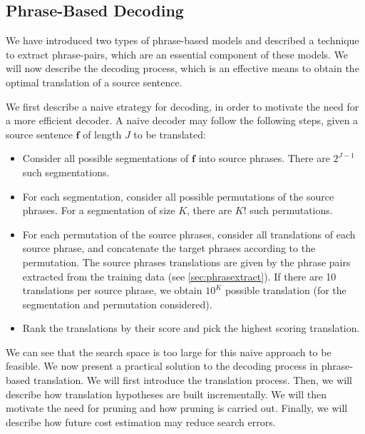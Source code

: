 \subsection{Phrase-Based Decoding}
\label{sec:phraseBasedDecoding}


We have introduced two types of phrase-based
models and described a technique to extract
phrase-pairs, which are an essential component
of these models. We will now describe the decoding
process, which is an effective means to obtain
the optimal translation of a source sentence.

We first describe a naive strategy for decoding, in order
to motivate the need for a more efficient decoder.
A naive decoder may follow the following steps, given
a source sentence $\bm{f}$ of length $J$ to be translated:
%
\begin{itemize}
  \item Consider all possible segmentations of $\bm{f}$ into source phrases. There are $2^{J - 1}$ such segmentations.
  \item For each segmentation, consider all possible permutations of the source phrases. For a segmentation of size $K$, there are $K!$ such permutations.
  \item For each permutation of the source phrases, consider all translations of each source phrase, and concatenate the target
    phrases according to the permutation. The source phrases translations are given by the phrase pairs extracted from the training
    data (see \autoref{sec:phrasextract}). If there are 10 translations per source phrase, we obtain
    $10^K$ possible translation (for the segmentation and permutation considered).
  \item Rank the translations by their score and pick the highest scoring translation.
\end{itemize}
%
We can see that the search space is too large for this naive
approach to be feasible.
We now present a practical solution to the decoding process in phrase-based translation.
We will first introduce the translation process. Then, we will
describe how translation hypotheses are built incrementally.
We will then motivate the need for pruning and how pruning
is carried out. Finally, we will describe how future cost estimation
may reduce search errors.

